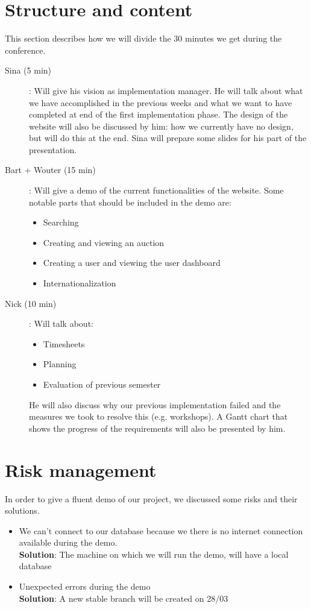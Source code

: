 \documentclass[a4paper, 12pt]{article}
\begin{document}
	\section{Structure and content}
		This section describes how we will divide the 30 minutes we get during the conference.
		\begin{description}
			\item[Sina (5 min)]: Will give his vision as implementation manager. He will talk about what we have accomplished in the previous weeks and what we want to have completed at end of the first implementation phase. The design of the website will also be discussed by him: how we currently have no design, but will do this at the end. Sina will prepare some slides for his part of the presentation.
			\item[Bart + Wouter (15 min)]: Will give a demo of the current functionalities of the website. Some notable parts that should be included in the demo are:
				\begin{itemize}
					\item Searching
					\item Creating and viewing an auction
					\item Creating a user and viewing the user dashboard
					\item Internationalization
				\end{itemize}
			\item[Nick (10 min)]: Will talk about:
				\begin{itemize}
					\item Timesheets
					\item Planning 
					\item Evaluation of previous semester
				\end{itemize}
				He will also discuss why our previous implementation failed and the measures we took to resolve this (e.g. workshops). A Gantt chart that shows the progress of the requirements will also be presented by him. 
		\end{description}
		
	\section{Risk management}
		In order to give a fluent demo of our project, we discussed some risks and their solutions.
		\begin{itemize}
			\item We can't connect to our database because we there is no internet connection available during the demo. \\
				\textbf{Solution}: The machine on which we will run the demo, will have a local database
			\item Unexpected errors during the demo \\
				\textbf{Solution}: A new stable branch will be created on 28/03
		\end{itemize} 
		
\end{document}
